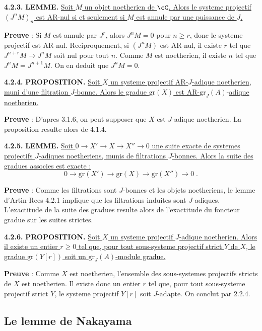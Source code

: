 \medskip
\noindent\textbf{4.2.3.} \textbf{LEMME.} \underline{Soit $M$ un objet noetherien de $\cC$. Alors le systeme projectif $(J^n M)_n$ est AR-nul si et seulement si $M$ est annule par une puissance de $J$.}

\textbf{Preuve} : Si $M$ est annule par $J^r$, alors $J^n M = 0$ pour $n \geq r$, donc le systeme projectif est AR-nul. Reciproquement, si $(J^n M)$ est AR-nul, il existe $r$ tel que $J^{n+r} M \longrightarrow J^n M$ soit nul pour tout $n$. Comme $M$ est noetherien, il existe $n$ tel que $J^n M = J^{n+1} M$. On en deduit que $J^n M = 0$.

\medskip
\noindent\textbf{4.2.4.} \textbf{PROPOSITION.} \underline{Soit $X$ un systeme projectif AR-$J$-adique noetherien, muni d'une filtration $J$-bonne. Alors le gradue $\mathrm{gr}(X)$ est AR-}$\mathrm{gr}_J(A)$-\underline{adique noetherien.}

\textbf{Preuve} : D'apres 3.1.6, on peut supposer que $X$ est $J$-adique noetherien. La proposition resulte alors de 4.1.4.

\medskip
\noindent\textbf{4.2.5.} \textbf{LEMME.} \underline{Soit $0 \longrightarrow X' \longrightarrow X \longrightarrow X'' \longrightarrow 0$ une suite exacte de systemes projectifs $J$-adiques noetheriens, munis de filtrations $J$-bonnes. Alors la suite des gradues associes est exacte :}
\[
0 \longrightarrow \mathrm{gr}(X') \longrightarrow \mathrm{gr}(X) \longrightarrow \mathrm{gr}(X'') \longrightarrow 0\;.
\]

\textbf{Preuve} : Comme les filtrations sont $J$-bonnes et les objets noetheriens, le lemme d'Artin-Rees 4.2.1 implique que les filtrations induites sont $J$-adiques. L'exactitude de la suite des gradues resulte alors de l'exactitude du foncteur gradue sur les suites strictes.

\medskip
\noindent\textbf{4.2.6.} \textbf{PROPOSITION.} \underline{Soit $X$ un systeme projectif $J$-adique noetherien. Alors il existe un entier $r \geq 0$ tel que, pour tout sous-systeme projectif strict $Y$ de $X$, le gradue $\mathrm{gr}(Y[r])$ soit un $\mathrm{gr}_J(A)$-module gradue.}

\textbf{Preuve} : Comme $X$ est noetherien, l'ensemble des sous-systemes projectifs stricts de $X$ est noetherien. Il existe donc un entier $r$ tel que, pour tout sous-systeme projectif strict $Y$, le systeme projectif $Y[r]$ soit $J$-adapte. On conclut par 2.2.4.

\subsection{Le lemme de Nakayama}

